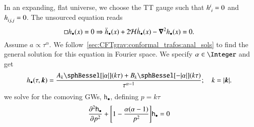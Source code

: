 

In an expanding, flat universe, we choose the TT gauge such that $h\indices{^i_i}=0$ and $h\indices{_{ij,j}}=0$. The unsourced equation reads
\begin{equation}
    \sq h_\bullet(x) = 0 \Rightarrow \ddot{h}_\bullet (x) + 2 \mathcal{H}\dot{h}_\bullet(x) - \vec{\nabla}^2 h_\bullet(x) = 0.
\end{equation}
Assume $a\propto \tau^\alpha$. We follow~\cref{sec:CFTgrav:conformal_trafos:anal_sols} to find the general solution for this equation in Fourier space. We specify $\alpha \in \Integer$ and get
\begin{equation}
    h_\bullet(\tau, \vec{k}) = \frac{A_k \sphBessel[\abs{\alpha}](k\tau) + B_k \sphBessel[-\abs{\alpha}](k\tau)}{\tau^{\alpha-1}}; \quad k= \abs{\vec{k}}.
\end{equation}
 we solve for the comoving GWs, $\mathsf{h}_\bullet$, defining $p=k\tau$
\begin{equation}
    \pdv[2]{\mathsf{h}_\bullet}{p} + {\left[ 1 - \frac{\alpha(\alpha - 1)}{p^2} \right]} \mathsf{h}_\bullet  = 0
\end{equation}
